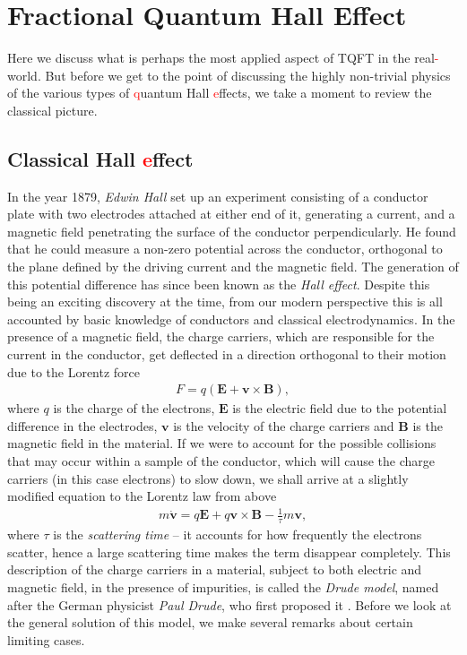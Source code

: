         \section{Fractional Quantum Hall Effect} \label{FQHE_sec}
        Here we discuss what is perhaps the most applied aspect of TQFT in the real\textcolor{red}{-}world. But before we get to the point of discussing the highly non-trivial physics of the various types of \textcolor{red}{q}uantum Hall \textcolor{red}{e}ffects, we take a moment to review the classical picture.
        \subsection{Classical Hall \textcolor{red}{e}ffect}
        In the year 1879, \textit{Edwin Hall} \cite{Hall1879} set up an experiment consisting of a conductor plate with two electrodes attached at either end of it, generating a current, and a magnetic field penetrating the surface of the conductor perpendicularly. He found that he could measure a non-zero potential across the conductor, orthogonal to the plane defined by the driving current and the magnetic field. The generation of this potential difference has since been known as the \textit{Hall effect}. Despite this being an exciting discovery at the time, from our modern perspective this is all accounted by basic knowledge of conductors and classical electrodynamics. In the presence of a magnetic field, the charge carriers, which are responsible for the current in the conductor, get deflected in a direction orthogonal to their motion due to the Lorentz force
        \begin{align}
            F = q(\bm{E} + \bm{v}\times \bm{B}),
        \end{align}
        where $q$ is the charge of the electrons, $\bm{E}$ is the electric field due to the potential difference in the electrodes, $\bm{v}$ is the velocity of the charge carriers and $\bm{B}$ is the magnetic field in the material. If we were to account for the possible collisions that may occur within a sample of the conductor, which will cause the charge carriers (in this case electrons) to slow down, we shall arrive at a slightly modified equation to the Lorentz law from above
        \begin{align}
            m \dot{\bm{v}} = q \bm{E}+q \bm{v}\times \bm{B} - \frac{1}{\tau} m \bm{v}, \label{eq:Drude_Model_Background}
        \end{align}
        where $\tau$ is the \textit{scattering time} -- it accounts for how frequently the electrons scatter, hence a large scattering time makes the term disappear completely. This description of the charge carriers in a material, subject to both electric and magnetic field, in the presence of impurities, is called the \textit{Drude model}, named after the German physicist \textit{Paul Drude}, who first proposed it \cite{Drude1900a, Drude1900b}. Before we look at the general solution of this model, we make several remarks about certain limiting cases.\\
